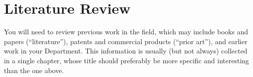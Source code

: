 \documentclass[main]{subfiles}
\begin{document}
\chapter{Literature Review}

You will need to review previous work in the field, which may include
books and papers (``literature''), patents and commercial products
(``prior art''), and earlier work in your Department.  This
information is usually (but not always) collected in a single chapter,
whose title should preferably be more specific and interesting than
the one above.
\end{document}
